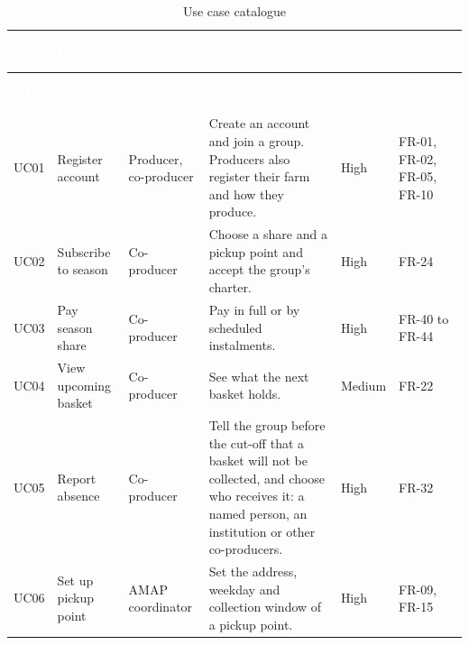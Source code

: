 \documentclass[11pt,a4paper]{article}
\begin{document}
{\footnotesize
\begin{longtable}{>{\raggedright\arraybackslash\hspace{0pt}}p{}>{\raggedright\arraybackslash\hspace{0pt}}p{}>{\raggedright\arraybackslash\hspace{0pt}}p{}>{\raggedright\arraybackslash\hspace{0pt}}p{}>{\raggedright\arraybackslash\hspace{0pt}}p{}>{\raggedright\arraybackslash\hspace{0pt}}p{}}
\caption{Use case catalogue}\label{tab:usecases}\\
\rowcolor{hdr}\textcolor{white}{\textbf{ID}} & \textcolor{white}{\textbf{Use case}} & \textcolor{white}{\textbf{Actor}} & \textcolor{white}{\textbf{Summary}} & \textcolor{white}{\textbf{Prio.}} & \textcolor{white}{\textbf{Related FR}} \\ \endfirsthead
\rowcolor{hdr}\textcolor{white}{\textbf{ID}} & \textcolor{white}{\textbf{Use case}} & \textcolor{white}{\textbf{Actor}} & \textcolor{white}{\textbf{Summary}} & \textcolor{white}{\textbf{Prio.}} & \textcolor{white}{\textbf{Related FR}} \\ \endhead
UC01 & Register account & Producer, co-producer & Create an account and join a group. Producers also register their farm and how they produce. & High & FR-01, FR-02, FR-05, FR-10 \\ \hline
UC02 & Subscribe to season & Co-producer & Choose a share and a pickup point and accept the group's charter. & High & FR-24 \\ \hline
UC03 & Pay season share & Co-producer & Pay in full or by scheduled instalments. & High & FR-40 to FR-44 \\ \hline
UC04 & View upcoming basket & Co-producer & See what the next basket holds. & Medium & FR-22 \\ \hline
UC05 & Report absence & Co-producer & Tell the group before the cut-off that a basket will not be collected, and choose who receives it: a named person, an institution or other co-producers. & High & FR-32 \\ \hline
UC06 & Set up pickup point & AMAP coordinator & Set the address, weekday and collection window of a pickup point. & High & FR-09, FR-15 \\ \hline

\end{longtable}}
\end{document}
